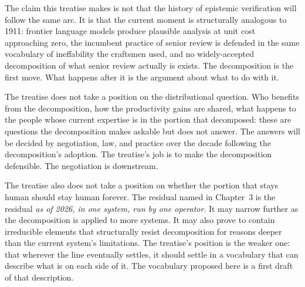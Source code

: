 \documentclass[11pt]{article}
\begin{document}
The claim this treatise makes is not that the history of epistemic verification will follow the same arc. It is that the current moment is structurally analogous to 1911: frontier language models produce plausible analysis at unit cost approaching zero, the incumbent practice of senior review is defended in the same vocabulary of ineffability the craftsmen used, and no widely-accepted decomposition of what senior review actually is exists. The decomposition is the first move. What happens after it is the argument about what to do with it.

The treatise does not take a position on the distributional question. Who benefits from the decomposition, how the productivity gains are shared, what happens to the people whose current expertise is in the portion that decomposed: these are questions the decomposition makes askable but does not answer. The answers will be decided by negotiation, law, and practice over the decade following the decomposition's adoption. The treatise's job is to make the decomposition defensible. The negotiation is downstream.

The treatise also does not take a position on whether the portion that stays human should stay human forever. The residual named in Chapter~3 is the residual \emph{as of 2026, in one system, run by one operator}. It may narrow further as the decomposition is applied to more systems. It may also prove to contain irreducible elements that structurally resist decomposition for reasons deeper than the current system's limitations. The treatise's position is the weaker one: that wherever the line eventually settles, it should settle in a vocabulary that can describe what is on each side of it. The vocabulary proposed here is a first draft of that description.
\end{document}
